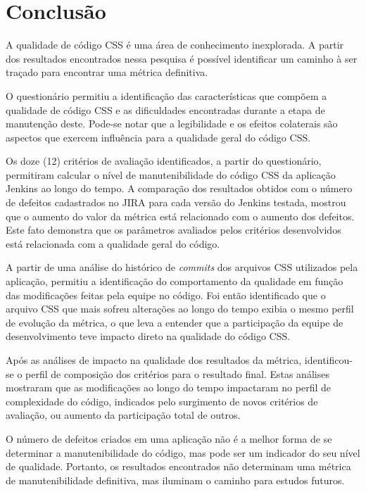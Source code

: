 %
%

\chapter{Conclusão}

A qualidade de código CSS é uma área de conhecimento inexplorada. A partir dos resultados encontrados nessa pesquisa é possível identificar um caminho à ser traçado para encontrar uma métrica definitiva.

O questionário permitiu a identificação das características que compõem a qualidade de código CSS e as dificuldades encontradas durante a etapa de manutenção deste. Pode-se notar que a legibilidade e os efeitos colaterais são aspectos que exercem influência para a qualidade geral do código CSS. 

Os doze (12) critérios de avaliação identificados, a partir do questionário, permitiram calcular o nível de manutenibilidade do código CSS da aplicação Jenkins ao longo do tempo. A comparação dos resultados obtidos com o número de defeitos cadastrados no JIRA para cada versão do Jenkins testada, mostrou que o aumento do valor da métrica está relacionado com o aumento dos defeitos. Este fato demonstra que os parâmetros avaliados pelos critérios desenvolvidos está relacionada com a qualidade geral do código.

A partir de uma análise do histórico de \textit{commits} dos arquivos CSS utilizados pela aplicação, permitiu a identificação do comportamento da qualidade em função das modificações feitas pela equipe no código. Foi então identificado que o arquivo CSS que mais sofreu alterações ao longo do tempo exibia o mesmo perfil de evolução da métrica, o que leva a entender que a participação da equipe de desenvolvimento teve impacto direto na qualidade do código CSS.

Após as análises de impacto na qualidade dos resultados da métrica, identificou-se o perfil de composição dos critérios para o resultado final. Estas análises mostraram que as modificações ao longo do tempo impactaram no perfil de complexidade do código, indicados pelo surgimento de novos critérios de avaliação, ou aumento da participação total de outros.

O número de defeitos criados em uma aplicação não é a melhor forma de se determinar a manutenibilidade do código, mas pode ser um indicador do seu nível de qualidade. Portanto, os resultados encontrados não determinam uma métrica de manutenibilidade definitiva, mas iluminam o caminho para estudos futuros.

